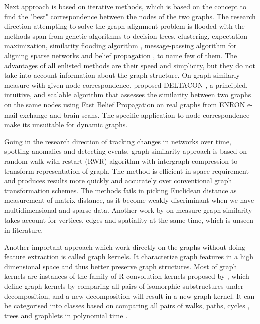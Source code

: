 \documentclass[12pt,a4paper]{article}
\numberwithin{equation}{section}
\numberwithin{figure}{section}
\numberwithin{table}{section}
\begin{document}
Next approach is based on iterative methods, which is based on the concept to find the "best" correspondence between the nodes of the two graphs. The research direction attempting to solve the graph alignment problem is flooded with the methods span from genetic algorithms to decision trees, clustering, expectation-maximization, similarity flooding algorithm \citep{Melnik2002}, message-passing algorithm for aligning sparse networks and belief propagation \citep{Koutra2013}, to name few of them. The advantages of all enlisted methods are their speed and simplicity, but they do not take into account information about the graph structure. On graph similarly measure with given node correspondence, \citet{Koutra2013} proposed DELTACON , a principled, intuitive, and scalable algorithm that assesses the similarity between two graphs on the same nodes using Fast Belief Propagation on real graphs from ENRON e-mail exchange and brain scans. The specific application to node correspondence make its unsuitable for dynamic graphs.

Going in the research direction of tracking changes in networks over time, spotting anomalies and detecting events, \citet{Lee2015} graph similarity approach is based on random walk with restart (RWR) algorithm with intergraph compression to transform representation of graph. The method is efficient in space requirement and produces results more quickly and accurately over conventional graph transformation schemes. The methods fails in picking Euclidean distance as measurement of matrix distance, as it become weakly discriminant when we have multidimensional and sparse data. Another work by \citet{Mheich2015} on measure graph similarity takes account for vertices, edges and spatiality at the same time, which is unseen in literature.

Another important approach which work directly on the graphs without doing feature extraction is called graph kernels. It characterize graph features in a high dimensional space and thus better preserve graph structures. Most of graph kernels
are instances of the family of R-convolution kernels proposed by \citet{Haussler1999}, which define graph kernels by comparing all pairs of isomorphic substructures under decomposition, and a new decomposition
will result in a new graph kernel. It can be categorised into classes based on comparing all pairs of walks, paths, cycles \citep{Aziz2013}, trees and graphlets in polynomial time \citep{Vishwanathan2010}.
\end{document}
